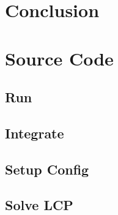 \documentclass[10pt,oneside,a4paper,final,english]{memoir}
\begin{document}
\section{Conclusion}


\appendix
\section{Source Code}

\subsection{Run}


\subsection{Integrate}


\subsection{Setup Config}


\subsection{Solve LCP}

\end{document}

